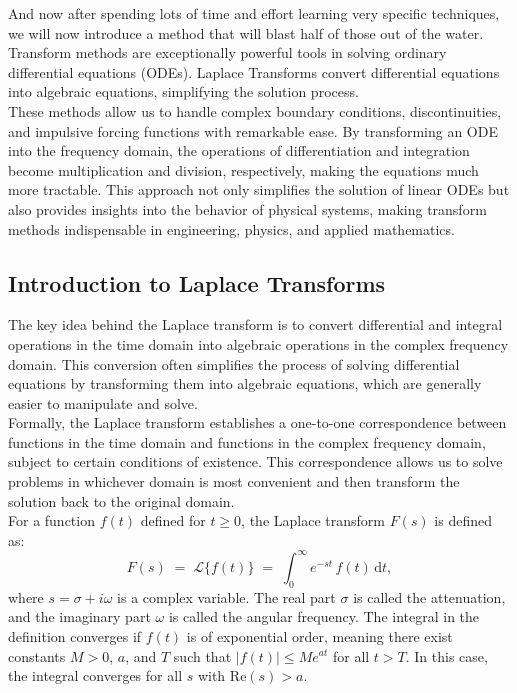 \newpage

 

And now after spending lots of time and effort learning very specific techniques, we will now introduce a method that will blast half of those out of the water. Transform methods are exceptionally powerful tools in solving ordinary differential equations (ODEs). Laplace Transforms convert differential equations into algebraic equations, simplifying the solution process. \\

\noindent These methods allow us to handle complex boundary conditions, discontinuities, and impulsive forcing functions with remarkable ease. By transforming an ODE into the frequency domain, the operations of differentiation and integration become multiplication and division, respectively, making the equations much more tractable. This approach not only simplifies the solution of linear ODEs but also provides insights into the behavior of physical systems, making transform methods indispensable in engineering, physics, and applied mathematics.

\subsection*{Introduction to Laplace Transforms} 

\noindent
The key idea behind the Laplace transform is to convert differential and integral operations in the time domain into algebraic operations in the complex frequency domain. This conversion often simplifies the process of solving differential equations by transforming them into algebraic equations, which are generally easier to manipulate and solve. \\

\noindent
Formally, the Laplace transform establishes a one-to-one correspondence between functions in the time domain and functions in the complex frequency domain, subject to certain conditions of existence. This correspondence allows us to solve problems in whichever domain is most convenient and then transform the solution back to the original domain. \\

\noindent For a function \(f(t)\) defined for \(t \geq 0\), the Laplace transform \(F(s)\) is defined as:
\[
F(s) \;=\; \mathcal{L}\{f(t)\} \;=\; \int_{0}^{\infty} e^{-s t}\,f(t)\,\mathrm{d}t,
\]
where \(s = \sigma + i\omega\) is a complex variable. The real part \(\sigma\) is called the attenuation, and the imaginary part \(\omega\) is called the angular frequency. The integral in the definition converges if \(f(t)\) is of exponential order, meaning there exist constants \(M > 0\), \(a\), and \(T\) such that \(\lvert f(t)\rvert \leq M e^{a t}\) for all \(t > T\). In this case, the integral converges for all \(s\) with \(\mathrm{Re}(s) > a\). \\

